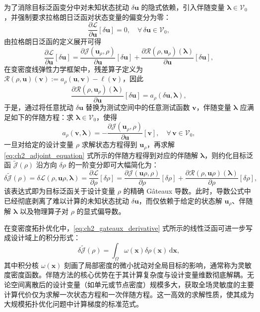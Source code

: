 为了消除目标泛函变分中对未知状态扰动 $\delta\boldsymbol{u}$ 的隐式依赖，引入伴随变量 $\boldsymbol{\lambda}\in\mathcal{V}_0$，并强制要求拉格朗日泛函对状态变量的偏变分为零：
\[
\frac{\partial\mathcal{L}}{\partial\boldsymbol{u}}[\delta\boldsymbol{u}] = 0, \quad \forall\,\delta\boldsymbol{u}\in\mathcal{V}_0,
\]
由拉格朗日泛函的定义展开可得
\[
\frac{\partial\mathcal{L}}{\partial\boldsymbol{u}}[\delta\boldsymbol{u}] = \frac{\partial\mathcal{J}( \boldsymbol{u}_\rho,\rho)}{\partial\boldsymbol{u}}[\delta\boldsymbol{u}] + \frac{\partial\mathcal{R}(\rho,\boldsymbol{u}_\rho)(\boldsymbol\lambda)}{\partial\boldsymbol{u}}[\delta\boldsymbol{u}],
\]
在变密度线弹性力学框架中，残差算子定义为 $\mathcal{R}(\rho,\boldsymbol{u})(\boldsymbol{v}) := a_\rho(\boldsymbol{u},\boldsymbol{v}) - \ell(\boldsymbol{v})$，因此
\[
\frac{\partial\mathcal{R}(\rho,\boldsymbol{u}_\rho)(\boldsymbol\lambda)}{\partial\boldsymbol{u}}[\delta\boldsymbol{u}] = a_\rho(\delta\boldsymbol{u},\boldsymbol{\lambda}),
\]
于是，通过将任意扰动 $\delta\boldsymbol{u}$ 替换为测试空间中的任意测试函数 $\boldsymbol{v}$，伴随变量 $\boldsymbol{\lambda}$ 应满足如下的伴随方程：求 $\boldsymbol{\lambda}\in\mathcal{V}_0$，使得
\begin{equation}
	a_\rho(\boldsymbol{v},\boldsymbol{\lambda}) = -\frac{\partial\mathcal{J}( \boldsymbol{u}_\rho,\rho)}{\partial\boldsymbol{u}}[\boldsymbol{v}],\quad \forall\,\boldsymbol{v}\in\mathcal{V}_0,
	\label{eq:ch2_adjoint_equation}
\end{equation}
一旦对给定的设计变量 $\rho$ 求解状态方程得到 $\boldsymbol{u}_\rho$​，再求解 \eqref{eq:ch2_adjoint_equation} 式所示的伴随方程得到对应的伴随解 $\boldsymbol{\lambda}$，则约化目标泛函 $\tilde{\mathcal{J}}(\rho)$ 沿方向 $\delta\rho$ 的一阶变分即可大幅简化为：
\begin{equation} 
	\delta\tilde{\mathcal{J}}(\rho) = \delta\mathcal{L}(\rho, \boldsymbol{u}\rho, \boldsymbol{\lambda}) = \frac{\partial\mathcal{L}}{\partial\rho}[\delta\rho] = \frac{\partial\mathcal{J}(\boldsymbol{u}\rho, \rho)}{\partial\rho}[\delta\rho] + \frac{\partial\mathcal{R}(\rho, \boldsymbol{u}\rho)(\boldsymbol{\lambda})}{\partial\rho}[\delta\rho],
	\label{eq:ch2_gateaux_derivative}
\end{equation}
该表达式即为目标泛函关于设计变量 $\rho$ 的精确 Gâteaux 导数。此时，导数公式中已经彻底剥离了难以计算的未知状态扰动 $\delta\boldsymbol{u}$，而仅依赖于给定的状态解 $\boldsymbol{u}_\rho$、伴随解 $\boldsymbol{\lambda}$ 以及物理算子对 $\rho$ 的显式偏导数。

在变密度拓扑优化中，\eqref{eq:ch2_gateaux_derivative} 式所示的线性泛函可进一步写成设计域上的积分形式：
\[
\delta\tilde{\mathcal{J}}(\rho) = \int_{\Omega} \omega(\boldsymbol{x}) \delta\rho(\boldsymbol{x}) \,\mathrm{d}\boldsymbol{x},
\]
其中积分核 $\omega(\boldsymbol{x})$ 刻画了局部密度的微小扰动对全局目标的影响，通常称为灵敏度密度函数。伴随方法的核心优势在于其计算复杂度与设计变量维数彻底解耦。无论空间离散后的设计变量（如单元或节点密度）规模多大，获取全场灵敏度的主要计算代价仅为求解一次状态方程和一次伴随方程。这一高效的求解性质，使其成为大规模拓扑优化问题中计算梯度的标准范式。


